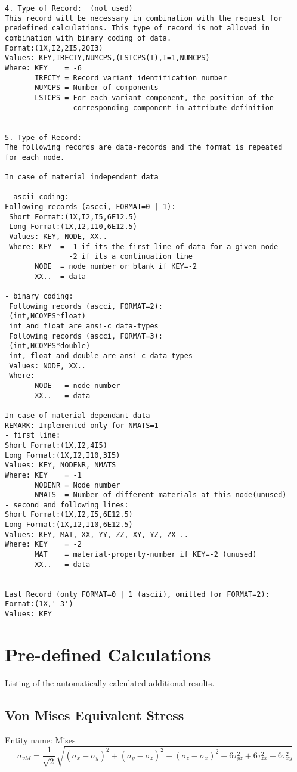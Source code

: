 \documentclass{article}
\begin{document}
\begin{verbatim}
4. Type of Record:  (not used)
This record will be necessary in combination with the request for 
predefined calculations. This type of record is not allowed in
combination with binary coding of data.
Format:(1X,I2,2I5,20I3) 
Values: KEY,IRECTY,NUMCPS,(LSTCPS(I),I=1,NUMCPS)
Where: KEY    = -6
       IRECTY = Record variant identification number
       NUMCPS = Number of components
       LSTCPS = For each variant component, the position of the
                corresponding component in attribute definition


5. Type of Record:
The following records are data-records and the format is repeated
for each node.

In case of material independent data

- ascii coding:
Following records (ascci, FORMAT=0 | 1):
 Short Format:(1X,I2,I5,6E12.5)
 Long Format:(1X,I2,I10,6E12.5)
 Values: KEY, NODE, XX..
 Where: KEY  = -1 if its the first line of data for a given node
               -2 if its a continuation line
       NODE  = node number or blank if KEY=-2
       XX..  = data

- binary coding:
 Following records (ascci, FORMAT=2):
 (int,NCOMPS*float)
 int and float are ansi-c data-types
 Following records (ascci, FORMAT=3):
 (int,NCOMPS*double)
 int, float and double are ansi-c data-types
 Values: NODE, XX..
 Where:
       NODE   = node number
       XX..   = data

In case of material dependant data
REMARK: Implemented only for NMATS=1
- first line:
Short Format:(1X,I2,4I5)
Long Format:(1X,I2,I10,3I5)
Values: KEY, NODENR, NMATS
Where: KEY    = -1
       NODENR = Node number
       NMATS  = Number of different materials at this node(unused)
- second and following lines:
Short Format:(1X,I2,I5,6E12.5)
Long Format:(1X,I2,I10,6E12.5)
Values: KEY, MAT, XX, YY, ZZ, XY, YZ, ZX ..
Where: KEY    = -2 
       MAT    = material-property-number if KEY=-2 (unused)
       XX..   = data

  
Last Record (only FORMAT=0 | 1 (ascii), omitted for FORMAT=2):
Format:(1X,'-3')
Values: KEY

\end{verbatim}
 
\section{\label{Pre-defined Calculations}Pre-defined Calculations}
Listing of the automatically calculated additional results.

\subsection{\label{Von Mises Equivalent Stress}Von Mises Equivalent Stress}
Entity name: Mises\\
\[  \sigma_{vM} = \frac{1}{\sqrt{2}} \sqrt{(\sigma_{x}-\sigma_{y})^{2}+(\sigma_{y}-\sigma_{z})^{2}+(\sigma_{z}-\sigma_{x})^{2}+6\tau_{yz}^{2}+6\tau_{zx}^{2}+6\tau_{xy}^{2}} \]
\end{document}
